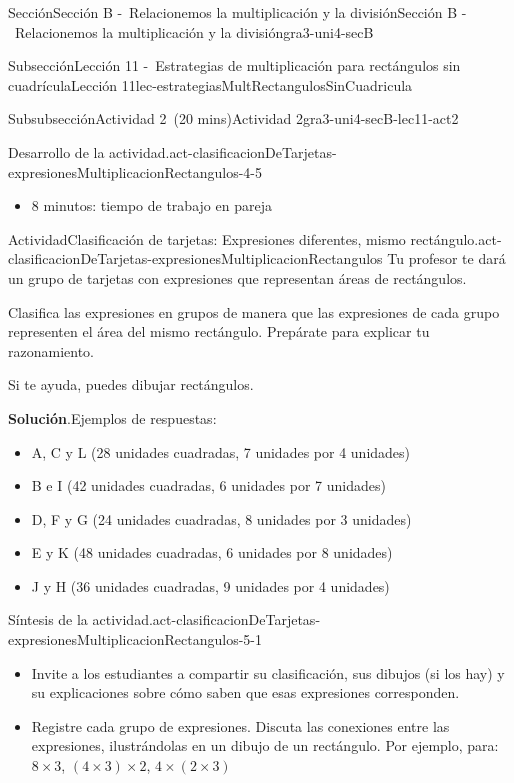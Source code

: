 \documentclass[oneside,10pt,]{article}
\newcommand{\blocktitlefont}{\relax}
\begin{document}
\begin{sectionptx}{Sección}{Sección B -~Relacionemos la multiplicación y la división}{}{Sección B -~Relacionemos la multiplicación y la división}{}{}{gra3-uni4-secB}
\begin{subsectionptx}{Subsección}{Lección 11 -~Estrategias de multiplicación para rectángulos sin cuadrícula}{}{Lección 11}{}{}{lec-estrategiasMultRectangulosSinCuadricula}
\begin{subsubsectionptx}{Subsubsección}{Actividad 2~(20 mins)}{}{Actividad 2}{}{}{gra3-uni4-secB-lec11-act2}
\begin{paragraphs}{Desarrollo de la actividad.}{act-clasificacionDeTarjetas-expresionesMultiplicacionRectangulos-4-5}
\begin{itemize}[label=\textbullet]
\item{}8 minutos: tiempo de trabajo en pareja%
\end{itemize}
\end{paragraphs}%
\begin{activity}{Actividad}{Clasificación de tarjetas: Expresiones diferentes, mismo rectángulo.}{act-clasificacionDeTarjetas-expresionesMultiplicacionRectangulos}%
Tu profesor te dará un grupo de tarjetas con expresiones que representan áreas de rectángulos.%
\par
Clasifica las expresiones en grupos de manera que las expresiones de cada grupo representen el área del mismo rectángulo. Prepárate para explicar tu razonamiento.%
\par
Si te ayuda, puedes dibujar rectángulos.%
\par\smallskip%
\noindent\textbf{\blocktitlefont Solución}.\hypertarget{act-clasificacionDeTarjetas-expresionesMultiplicacionRectangulos-3}{}\quad{}Ejemplos de respuestas:%
%
\begin{itemize}[label=\textbullet]
\item{}A, C y L (28 unidades cuadradas, 7 unidades por 4 unidades)%
\item{}B e I (42 unidades cuadradas, 6 unidades por 7 unidades)%
\item{}D, F y G (24 unidades cuadradas, 8 unidades por 3 unidades)%
\item{}E y K (48 unidades cuadradas, 6 unidades por 8 unidades)%
\item{}J y H (36 unidades cuadradas, 9 unidades por 4 unidades)%
\end{itemize}
\end{activity}%
%
\par
\begin{paragraphs}{Síntesis de la actividad.}{act-clasificacionDeTarjetas-expresionesMultiplicacionRectangulos-5-1}%
%
\begin{itemize}[label=\textbullet]
\item{}Invite a los estudiantes a compartir su clasificación, sus dibujos (si los hay) y su explicaciones sobre cómo saben que esas expresiones corresponden.%
\item{}Registre cada grupo de expresiones. Discuta las conexiones entre las expresiones, ilustrándolas en un dibujo de un rectángulo. Por ejemplo, para: \(8 \times 3\), \((4 \times 3) \times 2\), \(4 \times (2 \times 3)\)%

\end{itemize}
\end{paragraphs}
\end{subsubsectionptx}
\end{subsectionptx}
\end{sectionptx}
\end{document}
